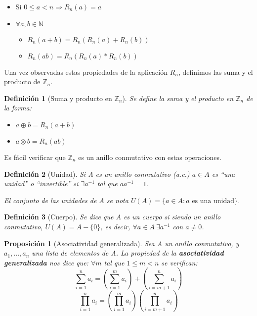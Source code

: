 \documentclass[11pt, a4paper, titlepage]{article}
\newif\IfInSansMode
\providecommand{\ent}{\mathbb{Z}}
\theoremstyle{theorem-style}
\newtheorem{nprop}{Proposición}[section]
\theoremstyle{definition-style}
\newtheorem{ndef}{Definición}[section]
\theoremstyle{remark-style}
\theoremstyle{example-style}
\begin{document}
\begin{itemize}
\item Si $0 \leq a < n  \Rightarrow R_n(a) = a$
\item $\forall a,b \in \mathbb{N}$

\begin{itemize}
	\item  $R_n(a+b) = R_n(R_n(a) + R_n(b))$
	\item $R_n(ab) = R_n(R_n(a)*R_n(b))$
\end{itemize}

\end{itemize}


Una vez observadas estas propiedades de la aplicación $R_n$, definimos las suma y el producto de $\mathbb{Z}_n$.
\begin{ndef}[Suma y producto en $\ent_n$] Se define la suma y el producto en $\ent_n$ de la forma:
	\begin{itemize}
	\item $a\oplus b = R_n(a+b)$
	\item $a\otimes b = R_n(ab)$
\end{itemize}

\end{ndef}



Es fácil verificar que $\mathbb{Z}_n$ es un anillo conmutativo con estas operaciones.\\

\begin{ndef}[Unidad]
  Si A es un anillo conmutativo (a.c.) $a \in A$ es ``una unidad'' o ``invertible'' si $\exists a^{-1}$ tal que $ aa^{-1} = 1$.

  El conjunto de las unidades de $A$ se nota $U(A) = \{ a \in A : a \text{ es una unidad} \}$.
\end{ndef}



\begin{ndef}[Cuerpo] Se dice que $A$ es un cuerpo si siendo un anillo conmutativo, $U(A) = A - \{0\}$, es decir, $\forall a \in A \ \exists a^{-1}$  con $a \neq 0$.
\end{ndef}


\begin{nprop}[Asociatividad generalizada]
	Sea A un anillo conmutativo, y $a_1, ..., a_n$ una lista de elementos de A.
La propiedad de la \textbf{asociatividad generalizada} nos dice que:
$\forall m$ tal que $1 \leq m < n$ se verifican: \[\sum_{i=1}^{n}a_i = \left(\sum_{i=1}^{m}a_i\right) + \left(\sum_{i=m+1}^{n}a_i\right)\]\[\prod_{i=1}^{n}a_i = \left(\prod_{i=1}^{m}a_i\right)\left(\prod_{i=m+1}^{n}a_i\right)\]\\
\end{nprop}
\end{document}
